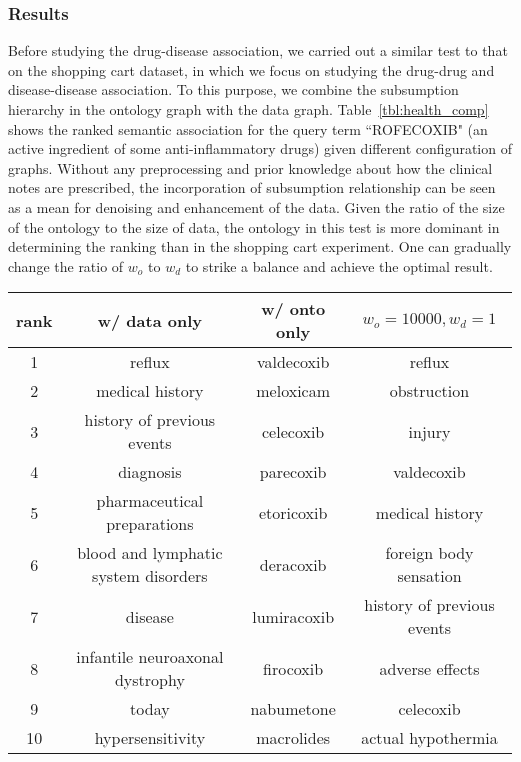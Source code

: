 \subsubsection{Results}
Before studying the drug-disease association, we carried out a similar test to that on the shopping cart dataset, in which we focus on studying the drug-drug and disease-disease association. To this purpose, we combine the subsumption hierarchy in the ontology graph with the data graph. Table~\ref{tbl:health_comp} shows the ranked semantic association for the query term ``ROFECOXIB" (an active ingredient of some anti-inflammatory drugs) given different configuration of graphs. Without any preprocessing and prior knowledge about how the clinical notes are prescribed, the incorporation of subsumption relationship can be seen as a mean for denoising and enhancement of the data. Given the ratio of the size of the ontology to the size of data, the ontology in this test is more dominant in determining the ranking than in the shopping cart experiment. One can gradually change the ratio of $w_o$ to $w_d$ to strike a balance and achieve the optimal result.
\begin{table*}[tbh]\scriptsize
\begin{center}
\begin{tabular}{ c | c | c | c  }
\hline
rank    &   w/ data only	&	w/ onto only		&$w_o=10000, w_d=1$	 \\
\hline
1	&		reflux	&	valdecoxib	&		reflux	\\
2	&		medical history	&	meloxicam	&		obstruction	\\
3	&		history of previous events	&	celecoxib	&		injury	\\
4	&		diagnosis	&	parecoxib	&		valdecoxib	\\
5	&		pharmaceutical preparations	&	etoricoxib	&		medical history	\\
6	&		blood and lymphatic system disorders	&	deracoxib	&		foreign body sensation	\\
7	&		disease	&	lumiracoxib	&		history of previous events	\\
8	&		infantile neuroaxonal dystrophy	&	firocoxib	&		adverse effects	\\
9	&		today	&	nabumetone	&		celecoxib	\\
10	&		hypersensitivity	&	macrolides	&		actual hypothermia	\\
\hline
\end{tabular}
\end{center}
\caption[Top results on the electronic health dataset.]{\label{tbl:health_comp}Results of Health items ranked by the strength of semantic association, given the query term ``rofecoxib".}
\end{table*}

